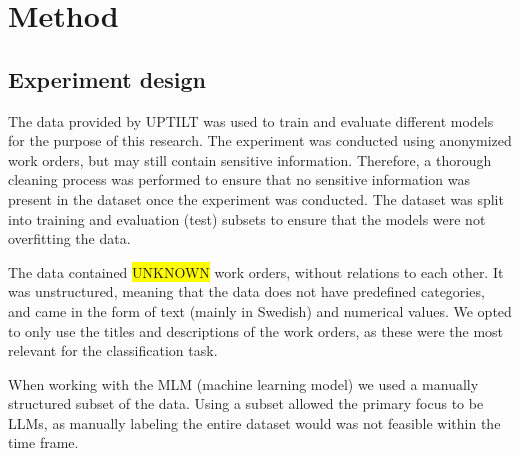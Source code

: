 \section{Method}
%
%
%

\subsection{Experiment design}
%
%
%
%
The data provided by UPTILT was used to train and evaluate different models for the
purpose of this research. The experiment was conducted using anonymized work
orders, but may still contain sensitive information. Therefore, a thorough cleaning
process was performed to ensure that no sensitive information was present in the
dataset once the experiment was conducted. The dataset was split into training
and evaluation (test) subsets to ensure that the models were not overfitting the
data.

The data contained \colorbox{yellow}{UNKNOWN} work orders, without relations to each
other. It was unstructured, meaning that the data does not have predefined categories,
and came in the form of text (mainly in Swedish) and numerical values. We opted to
only use the titles and descriptions of the work orders, as these were the most
relevant for the classification task.

When working with the MLM (machine learning model) we used a manually structured
subset of the data. Using a subset allowed the primary focus to be LLMs, as
manually labeling the entire dataset would was not feasible within the time
frame.

